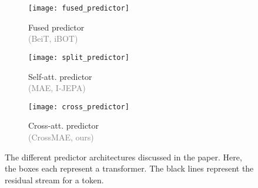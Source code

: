 \begin{figure}[b]
  \centering
  \hfill
    \begin{subfigure}[b]{0.32\linewidth}
      \centering
      \texttt{[image: fused\_predictor]}
        \caption{Fused predictor\\\textcolor{gray}{(BeiT, iBOT)}}
        \label{fig:pred_arch:fused}
    \end{subfigure}
    \hfill
    \begin{subfigure}[b]{0.32\linewidth}
      \centering
      \texttt{[image: split\_predictor]}
        \caption{Self-att. predictor\\\textcolor{gray}{(MAE, I-JEPA)}}
        \label{fig:pred_arch:split}
    \end{subfigure}
    \hfill
    \begin{subfigure}[b]{0.32\linewidth}
      \centering
      \texttt{[image: cross\_predictor]}
        \caption{Cross-att. predictor\\\textcolor{gray}{(CrossMAE, ours)}}
        \label{fig:pred_arch:cross}
    \end{subfigure}
    \caption{
        The different predictor architectures discussed in the paper. 
        Here, the boxes each represent a transformer.
        The black lines represent the residual stream for a token.
    }
    \label{fig:pred_arch}
\end{figure}


